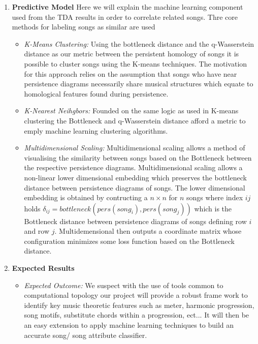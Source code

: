 \documentclass[11pt, a4paper]{article}
\begin{document}
\begin{enumerate}
\begin{itemize}
    \end{itemize}

  \item {\large \textbf{Predictive Model}}
    Here we will explain the machine learning component used from the TDA results in order to correlate related songs. Thre core methods for labeling songs as similar are used
    \begin{itemize}
    \item {\it K-Means Clustering:} Using the bottleneck distance and the q-Wasserstein distance as our metric between the persistent homology of songs it is possible to cluster songs using the K-means techniques. The motivation for this approach relies on the assumption that songs who have near persistence diagrams necessarily share musical structures which equate to homological features found during persistence.
    \item {\it K-Nearest Neihgbors:} Founded on the same logic as used in K-means clustering the Bottleneck and q-Wasserstein distance afford a metric to emply machine learning clustering algorithms.
    \item {\it Multidimensional Scaling:} Multidimensional scaling allows a method of visualising the similarity between songs based on the Bottleneck between the respective persistence diagrams. Multidimensional scaling allows a non-linear lower dimensional embedding which preserves the bottleneck distance between persistence diagrams of songs. The lower dimensional embedding is obtained by contructing a $n\times n$ for $n$ songs where index $ij$ holds $\delta_{ij} = bottleneck(pers(song_i), pers(song_j))$ which is the Bottleneck distance between persistence diagrams of songs defining row $i$ and row $j$. Multidemensional then outputs a coordinate matrix whose configuration minimizes some loss function based on the Bottleneck distance.
    \end{itemize}
    
    
\item {\large \textbf{Expected Results}}
  \begin{itemize}
  \item \textit{Expected Outcome:}
    We suspect with the use of tools common to computational topology our project will provide a robust frame work to identify key music theoretic features such as meter, harmonic progression, song motifs, substitute chords within a progression, ect... It will then be an easy extension to apply machine learning techniques to build an accurate song/ song attribute classifier. 


\end{itemize}
\end{enumerate}
\end{document}
